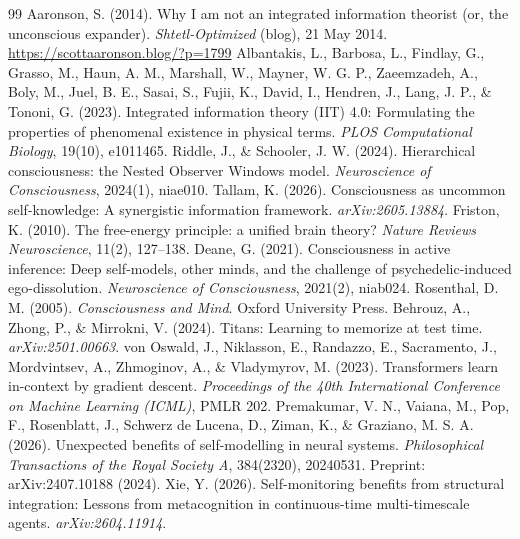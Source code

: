 \documentclass[11pt]{article}
\begin{document}
\begin{thebibliography}{99}
 Aaronson, S. (2014). Why I am not an integrated information theorist (or, the unconscious expander). \emph{Shtetl-Optimized} (blog), 21 May 2014. \url{https://scottaaronson.blog/?p=1799}
 Albantakis, L., Barbosa, L., Findlay, G., Grasso, M., Haun, A. M., Marshall, W., Mayner, W. G. P., Zaeemzadeh, A., Boly, M., Juel, B. E., Sasai, S., Fujii, K., David, I., Hendren, J., Lang, J. P., \& Tononi, G. (2023). Integrated information theory (IIT) 4.0: Formulating the properties of phenomenal existence in physical terms. \emph{PLOS Computational Biology}, 19(10), e1011465.
 Riddle, J., \& Schooler, J. W. (2024). Hierarchical consciousness: the Nested Observer Windows model. \emph{Neuroscience of Consciousness}, 2024(1), niae010.
 Tallam, K. (2026). Consciousness as uncommon self-knowledge: A synergistic information framework. \emph{arXiv:2605.13884}.
 Friston, K. (2010). The free-energy principle: a unified brain theory? \emph{Nature Reviews Neuroscience}, 11(2), 127--138.
 Deane, G. (2021). Consciousness in active inference: Deep self-models, other minds, and the challenge of psychedelic-induced ego-dissolution. \emph{Neuroscience of Consciousness}, 2021(2), niab024.
 Rosenthal, D. M. (2005). \emph{Consciousness and Mind}. Oxford University Press.
 Behrouz, A., Zhong, P., \& Mirrokni, V. (2024). Titans: Learning to memorize at test time. \emph{arXiv:2501.00663}.
 von Oswald, J., Niklasson, E., Randazzo, E., Sacramento, J., Mordvintsev, A., Zhmoginov, A., \& Vladymyrov, M. (2023). Transformers learn in-context by gradient descent. \emph{Proceedings of the 40th International Conference on Machine Learning (ICML)}, PMLR 202.
 Premakumar, V. N., Vaiana, M., Pop, F., Rosenblatt, J., Schwerz de Lucena, D., Ziman, K., \& Graziano, M. S. A. (2026). Unexpected benefits of self-modelling in neural systems. \emph{Philosophical Transactions of the Royal Society A}, 384(2320), 20240531. Preprint: arXiv:2407.10188 (2024).
 Xie, Y. (2026). Self-monitoring benefits from structural integration: Lessons from metacognition in continuous-time multi-timescale agents. \emph{arXiv:2604.11914}.

\end{thebibliography}
\end{document}
